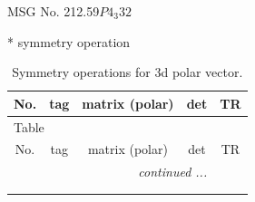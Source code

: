 \documentclass[fleqn,8pt]{jsarticle}
\begin{document}
\setcounter{MaxMatrixCols}{32}

\renewcommand{\tablename}{Table~}
\renewcommand{\figurename}{Figure~}
\begin{center}
\LARGE
MSG No. 212.59\quad$P4_{3}32$
\end{center}
* symmetry operation
\renewcommand{\arraystretch}{1.3}
\begin{longtable}{ccccc}
\caption{Symmetry operations for 3d polar vector.}
 \\
 \hline \hline
No. & tag & matrix (polar) & det & TR \\ \hline \endfirsthead

\multicolumn{4}{l}{\tablename\ \thetable{}} \\
 \hline \hline
No. & tag & matrix (polar) & det & TR \\ \hline \endhead

 \hline \hline
\multicolumn{4}{r}{\footnotesize\it continued ...} \\ \endfoot

 \hline \hline
\multicolumn{4}{r}{} \\ \endlastfoot


\end{longtable}
\end{document}
